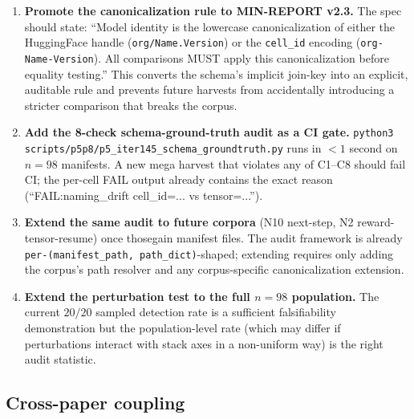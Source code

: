 \documentclass{article}  \usepackage[preprint,nonatbib]{neurips_2026} \usepackage[numbers]{natbib}
\begin{document}
\begin{enumerate}
\item \textbf{Promote the canonicalization rule to MIN-REPORT v2.3.} The
spec should state: ``Model identity is the lowercase canonicalization of
either the HuggingFace handle (\texttt{org/Name.Version}) or the
\texttt{cell\_id} encoding (\texttt{org-Name-Version}). All comparisons
MUST apply this canonicalization before equality testing.'' This converts
the schema's implicit join-key into an explicit, auditable rule and prevents
future harvests from accidentally introducing a stricter comparison that
breaks the corpus.

\item \textbf{Add the 8-check schema-ground-truth audit as a CI gate.}
\texttt{python3 scripts/p5p8/p5\_iter145\_schema\_groundtruth.py} runs in
$<1$ second on $n = 98$ manifests. A new mega harvest that violates any of
C1--C8 should fail CI; the per-cell FAIL output already contains the exact
reason (``FAIL:naming\_drift cell\_id=... vs tensor=...'').

\item \textbf{Extend the same audit to future corpora} (N10 next-step,
N2 reward-tensor-resume) once thosegain manifest files. The audit framework
is already \texttt{per-(manifest\_path, path\_dict)}-shaped; extending
requires only adding the corpus's path resolver and any
corpus-specific canonicalization extension.

\item \textbf{Extend the perturbation test to the full $n = 98$ population.}
The current $20/20$ sampled detection rate is a sufficient falsifiability
demonstration but the population-level rate (which may differ if perturbations
interact with stack axes in a non-uniform way) is the right audit statistic.
\end{enumerate}

\subsection*{Cross-paper coupling}
\end{document}
